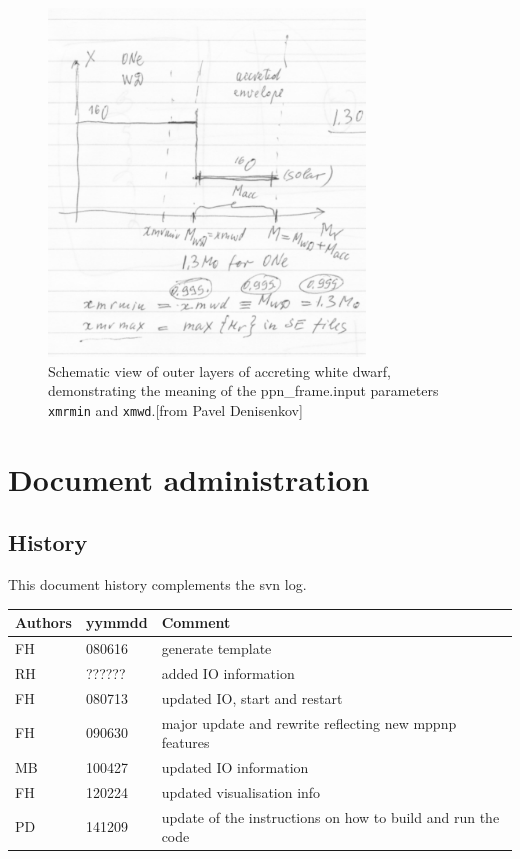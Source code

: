 \begin{figure}[tbp]
  \centering
   \includegraphics[width=0.75\textwidth]{nova-mppnp.pdf}
   \caption{Schematic view of outer layers of accreting white dwarf,
     demonstrating the meaning of the ppn\_frame.input parameters
    \texttt{xmrmin} and \texttt{xmwd}.[from Pavel Denisenkov]}
   \label{fig:nova_mppnp}
\end{figure}


\vfill
\section{Document administration}

\subsection{History} 
This document history complements the svn log.

\begin{tabular*}{\textwidth}{lll}
\hline
Authors & yymmdd & Comment \\
\hline
FH & 080616 & generate template \\
RH & ?????? & added IO information \\
FH & 080713 & updated IO, start and restart \\
FH & 090630 & major update and rewrite reflecting new mppnp features \\
MB & 100427 & updated IO information \\
FH & 120224 & updated visualisation info \\
PD & 141209 & update of the instructions on how to build and run the code \\
\hline
\end{tabular*}


